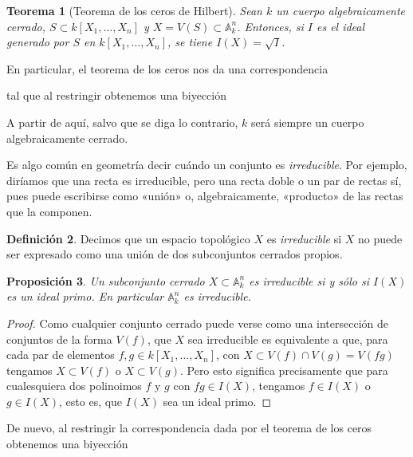\documentclass[12pt,a4paper]{article}
\newtheorem{thm}{Teorema}[section]
\newtheorem{prop}[thm]{Proposición}
\theoremstyle{definition} \newtheorem{defn}[thm]{Definición}
\theoremstyle{definition} \newtheorem{ejemplo}[thm]{Ejemplo}
\theoremstyle{definition} \newtheorem{ejercicio}[thm]{Ejercicio}
\theoremstyle{remark} \newtheorem*{obs}{Observación}
\def\AA{\mathbb{A}}
\begin{document}
  \begin{thm}[Teorema de los ceros de Hilbert]
    Sean $k$ un cuerpo algebraicamente cerrado, $S\subset k[X_1,\dots,X_n]$ y $X=V(S)\subset \AA_k^n$. Entonces, si $I$ es el ideal generado por $S$ en $k[X_1,\dots,X_n]$, se tiene $I(X)=\sqrt{I}$.
  \end{thm}
  En particular, el teorema de los ceros nos da una correspondencia
  \begin{center}
  \end{center}
  tal que al restringir obtenemos una biyección
  \begin{center}
  \end{center}
  A partir de aquí, salvo que se diga lo contrario, $k$ será siempre un cuerpo algebraicamente cerrado.

  Es algo común en geometría decir cuándo un conjunto es \emph{irreducible}. Por ejemplo, diríamos que una recta es irreducible, pero una recta doble o un par de rectas sí, pues puede escribirse como «unión» o, algebraicamente, «producto» de las rectas que la componen. 
  \begin{defn}
  Decimos que un espacio topológico $X$ es \emph{irreducible} si $X$ no puede ser expresado como una unión de dos subconjuntos cerrados propios. 
\end{defn}
  \begin{prop}
    Un subconjunto cerrado $X\subset \AA_k^n$ es irreducible si y sólo si $I(X)$ es un ideal primo. En particular $\AA_k^n$ es irreducible.
  \end{prop}
  \begin{proof}
    Como cualquier conjunto cerrado puede verse como una intersección de conjuntos de la forma $V(f)$, que $X$ sea irreducible es equivalente a que, para cada par de elementos $f,g\in k[X_1,\dots,X_n]$, con $X\subset V(f)\cap V(g)=V(fg)$ tengamos $X\subset V(f)$ o $X \subset V(g)$. Pero esto significa precisamente que para cualesquiera dos polinoimos $f$ y $g$ con $fg\in I(X)$, tengamos $f\in I(X)$ o $g\in I(X)$, esto es, que $I(X)$ sea un ideal primo.
  \end{proof}
  De nuevo, al restringir la correspondencia dada por el teorema de los ceros obtenemos una biyección
  \begin{center}
  \end{center}
\end{document}
